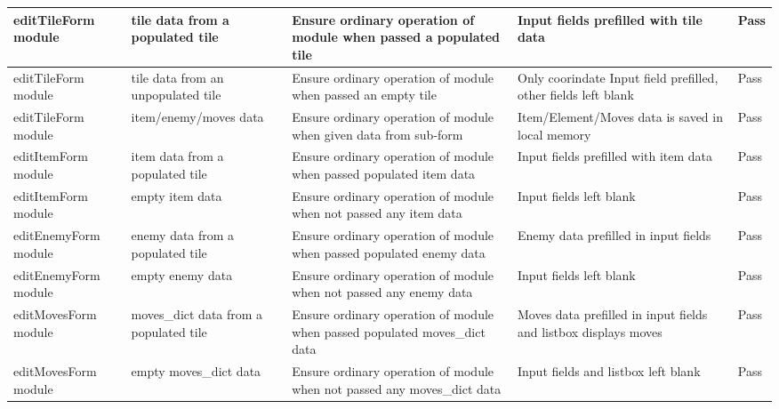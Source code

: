 \documentclass{article} \usepackage[margin=1in,headheight=57pt,headsep=0.1in]{geometry}
\begin{document}
\begin{center}
\begin{longtable}[H]{|p{2.9cm}|p{2.9cm}|p{2.9cm}|p{2.9cm}|p{2.9cm}|}
		editTileForm module & tile data from a populated tile & Ensure ordinary operation of module when passed a populated tile & Input fields prefilled with tile data & Pass \\ \hline
		editTileForm module & tile data from an unpopulated tile & Ensure ordinary operation of module when passed an empty tile & Only coorindate Input field prefilled, other fields left blank & Pass \\ \hline
		editTileForm module & item/enemy/moves data & Ensure ordinary operation of module when given data from sub-form & Item/Element/Moves data is saved in local memory & Pass \\ \hline
		editItemForm module & item data from a populated tile & Ensure ordinary operation of module when passed populated item data  & Input fields prefilled with item data & Pass \\ \hline
		editItemForm module & empty item data & Ensure ordinary operation of module when not passed any item data & Input fields left blank & Pass \\ \hline
		editEnemyForm module & enemy data from a populated tile & Ensure ordinary operation of module when passed populated enemy data & Enemy data prefilled in input fields & Pass \\ \hline
		editEnemyForm module & empty enemy data & Ensure ordinary operation of module when not passed any enemy data & Input fields left blank & Pass \\ \hline
		editMovesForm module & moves\_dict data from a populated tile & Ensure ordinary operation of module when passed populated moves\_dict data & Moves data prefilled in input fields and listbox displays moves & Pass \\ \hline
		editMovesForm module & empty moves\_dict data & Ensure ordinary operation of module when not passed any moves\_dict data & Input fields and listbox left blank & Pass \\ \hline
	\end{longtable}
\end{center}
\end{document}
